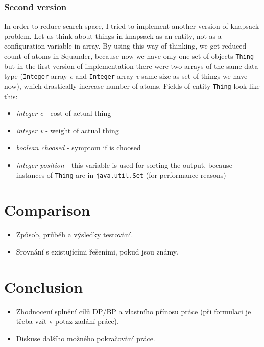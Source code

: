 \documentclass[11pt,twoside,a4paper]{book}
\begin{document}
\subsection{Second version}

In order to reduce search space, I tried to implement another version of
knapsack problem. Let us think about things in knapsack as an entity, not as a
configuration variable in array. By using this way of thinking, we get reduced
count of atoms in Squander, because now we have only one set of objects \verb|Thing| but in the
first version of implementation there were two arrays of the same data type
(\verb|Integer| array \textit{c} and \verb|Integer| array \textit{v} same size
as set of things we have now), which drastically increase number of atoms.
Fields of entity \verb|Thing| look like this:
\newpage
\begin{itemize}
  \item \textit{integer c} - cost of actual thing
  \item \textit{integer v} - weight of actual thing
  \item \textit{boolean choosed} - symptom if is choosed
  \item \textit{integer position} - this variable is used for sorting the
  output, because instances of \verb|Thing| are in \verb|java.util.Set|
  (for performance reasons)
\end{itemize}
\chapter{Comparison}

\begin{itemize}
 \item Způsob, průběh a výsledky testování.
 \item Srovnání s existujícími řešeními, pokud jsou známy.
\end{itemize} 


\chapter{Conclusion}

\begin{itemize}
\item Zhodnocení splnění cílů DP/BP a  vlastního přínosu práce (při formulaci je třeba vzít v potaz zadání práce).
\item Diskuse dalšího možného pokračování práce.
\end{itemize} 
\end{document}
